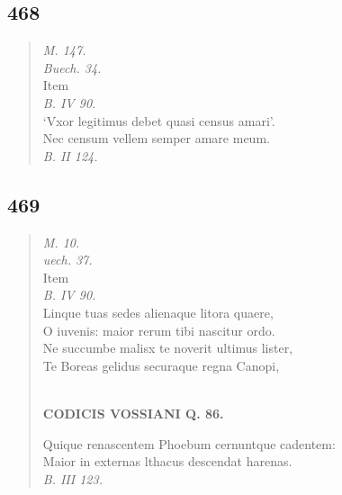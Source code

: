 \documentclass[11pt, a4paper]{report}
\begin{document}
            \subsection*{468}
      \begin{verse}
      \textit{M. 147.} \\ \textit{Buech. 34.} \\  \lbrack Item \rbrack  \\ \textit{B. IV 90.} \\ ‘Vxor legitimus debet quasi census amari’. \\ Nec censum vellem semper amare meum. \\ \textit{B. II 124.} \\ 
      \end{verse}
  
            \subsection*{469}
      \begin{verse}
      \textit{M. 10.} \\ \textit{uech. 37.} \\ Item \\ \textit{B. IV 90.} \\ Linque tuas sedes alienaque litora quaere, \\  \lbrack O \rbrack  iuvenis: maior rerum tibi nascitur ordo. \\ Ne succumbe malisx te noverit ultimus lister, \\ Te Boreas gelidus securaque regna Canopi, \\ 
        ﻿\pagebreak 
    \begin{center} \textbf{CODICIS VOSSIANI Q. 86.} \end{center} \marginpar{[345]} Quique renascentem Phoebum cernuntque cadentem: \\ Maior in externas lthacus descendat harenas. \\ \textit{B. III 123.} \\ 
      \end{verse}
  
\end{document}
